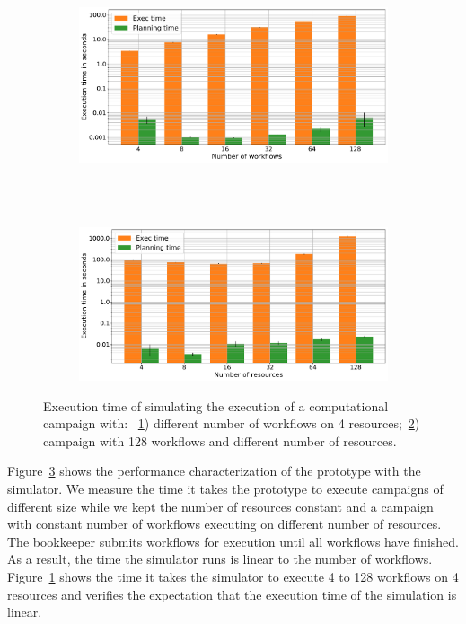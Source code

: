 \begin{figure}[ht!]
    \centering
    \begin{subfigure}[b]{0.75\textwidth}
        \includegraphics[width=.95\textwidth]{figures/manager/SimTimeWork.pdf}
        \caption{}
        \label{fig:SimTimeWork}
    \end{subfigure}\\
    ~ 
    \begin{subfigure}[b]{0.75\textwidth}
        \includegraphics[width=.95\textwidth]{figures/manager/SimTimeRes.pdf}
        \caption{}
        \label{fig:SimTimeRes}
    \end{subfigure}
    \caption{Execution time of simulating the execution of a computational campaign with: ~\ref{fig:SimTimeWork}) different number of workflows on 4 resources;~\ref{fig:SimTimeRes}) campaign with 128 workflows and different number of resources.}
    \label{fig:cm_char}
\end{figure}

Figure~\ref{fig:cm_char} shows the performance characterization of the prototype with the simulator.
We measure the time it takes the prototype to execute campaigns of different size while we kept the number of resources constant and a campaign with constant number of workflows executing on different number of resources.
The bookkeeper submits workflows for execution until all workflows have finished.
As a result, the time the simulator runs is linear to the number of workflows.
Figure~\ref{fig:SimTimeWork} shows the time it takes the simulator to execute 4 to 128 workflows on 4 resources and verifies the expectation that the execution time of the simulation is linear.

